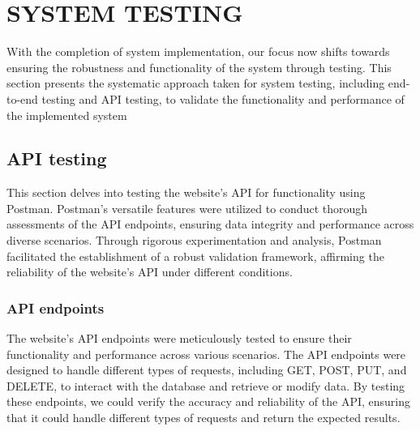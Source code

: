 \chapter{SYSTEM TESTING}

With the completion of system implementation, our focus now shifts towards ensuring the robustness and functionality of the system through testing. This section presents the systematic approach taken for system testing, including end-to-end testing and API testing, to validate the functionality and performance of the implemented system

\section{API testing}
This section delves into testing the website's API for functionality using 
Postman. Postman's versatile features were utilized to conduct thorough 
assessments of the API endpoints, ensuring data integrity and performance 
across diverse scenarios. Through rigorous experimentation and analysis, 
Postman facilitated the establishment of a robust validation framework, 
affirming the reliability of the website's API under different conditions.

\subsection{API endpoints}
The website's API endpoints were meticulously tested to ensure their
functionality and performance across various scenarios. The API endpoints
were designed to handle different types of requests, including GET, POST,
PUT, and DELETE, to interact with the database and retrieve or modify
data. By testing these endpoints, we could verify the accuracy and
reliability of the API, ensuring that it could handle different types of
requests and return the expected results.

